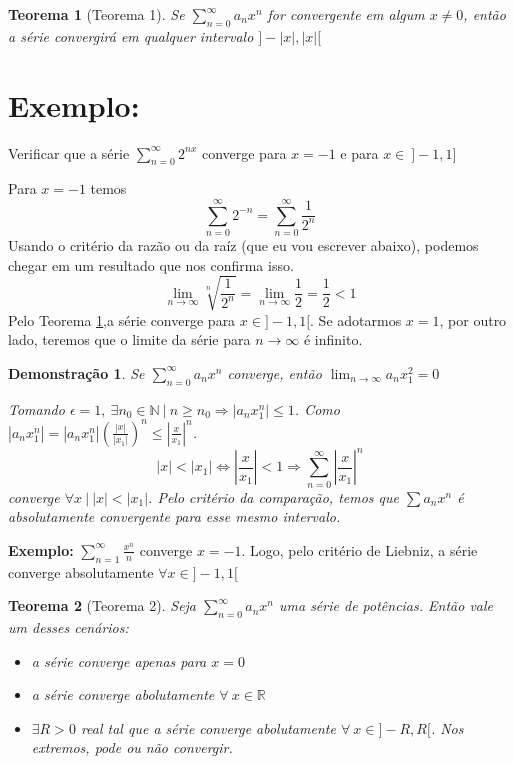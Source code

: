 \documentclass[12pt,openany, letterpaper]{book}
\newtheorem{theorem}{Teorema}[section]
\newtheorem{demonstration}{Demonstração}
\newcommand{\LI}[1][n]{\lim_{{#1} \rightarrow \infty}}
\newcommand{\soma}[2][n]{\sum_{{#1} = #2}^\infty}
\begin{document}
{{\begin{theorem}[Teorema 1]\label{T:5-1}
Se $\displaystyle{\soma{0} a_n x^n}$ for convergente em algum $x \neq 0$, então a série convergirá em qualquer  intervalo  $]-|x|, |x|[$
\end{theorem}

\section*{\textbf{Exemplo:}}{ Verificar que a série $\displaystyle{\soma{0} 2^{nx}}$ converge para $x = -1$ e para $x \in \ ]-1,1]$}

Para $x = -1$ temos $$\soma{0} 2^{-n} = \soma{0} \frac{1}{2^n}$$ Usando o critério da razão ou da raíz (que eu vou escrever abaixo), podemos chegar em um resultado que nos confirma isso. $$\LI \sqrt[n]{\frac{1}{2^n}} = \LI \frac{1}{2} = \frac{1}{2} < 1$$ Pelo Teorema \ref{T:5-1},a série converge para $x \in ]-1,1[$. Se adotarmos $x= 1$, por outro lado, teremos que o limite da série para $n \rightarrow \infty$ é infinito.

\begin{demonstration}
 Se $\displaystyle{\soma{0} a_n x^n}$ converge, então $\displaystyle{\LI a_n  x_1^2 = 0}$
 
 Tomando $\epsilon = 1, \  \exists n_0 \in \mathds{N} \ | \ n \geq n_0 \Rightarrow |a_n x_1^n| \leq 1$. Como $|a_n x_1^n|  = |a_n x_1^n| \left(\frac{|x|}{|x_1|}\right)^n \leq \left|\frac{x}{x_1}\right|^n$. $$ |x| < |x_1| \Longleftrightarrow \left|\frac{x}{x_1}\right| < 1 \Rightarrow \soma{0} \left|\frac{x}{x_1}\right|^n $$ converge $\forall x \ | \ |x| <|x_1|$. Pelo critério da comparação, temos que $\sum a_n x^n$ é absolutamente convergente para esse mesmo intervalo.
\end{demonstration}

\hspace{5mm}\textbf{Exemplo:} $\displaystyle{\soma{1} \frac{x^n}{n}}$ converge $x = -1$. Logo, pelo critério de Liebniz, a série converge absolutamente $\forall x \in ]-1,1[$

\begin{theorem}[Teorema 2]\label{T:5-2}
Seja  $\displaystyle{\soma{0} a_n x^n}$ uma série de potências. Então vale um desses cenários: \begin{itemize}
\item [(a)] a série converge apenas para $x=0$
\item [(b)] a série converge abolutamente $\forall \ x \in \mathds{R}$
\item [(c)] $\exists R > 0$ real tal que a série converge abolutamente $\forall \ x \in ]-R, R[$. Nos extremos, pode ou não convergir.
\end{itemize}


\end{theorem}}}
\end{document}
